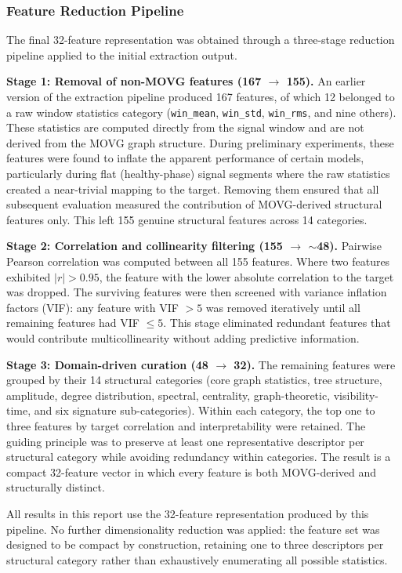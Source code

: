 \documentclass[a4paper,12pt]{article}
\begin{document}
\subsubsection{Feature Reduction Pipeline}

The final 32-feature representation was obtained through a three-stage reduction pipeline applied to the initial extraction output.

\textbf{Stage 1: Removal of non-MOVG features (167 $\to$ 155).} An earlier version of the extraction pipeline produced 167 features, of which 12 belonged to a raw window statistics category (\texttt{win\_mean}, \texttt{win\_std}, \texttt{win\_rms}, and nine others). These statistics are computed directly from the signal window and are not derived from the MOVG graph structure. During preliminary experiments, these features were found to inflate the apparent performance of certain models, particularly during flat (healthy-phase) signal segments where the raw statistics created a near-trivial mapping to the target. Removing them ensured that all subsequent evaluation measured the contribution of MOVG-derived structural features only. This left 155 genuine structural features across 14 categories.

\textbf{Stage 2: Correlation and collinearity filtering (155 $\to$ $\sim$48).} Pairwise Pearson correlation was computed between all 155 features. Where two features exhibited $|r| > 0.95$, the feature with the lower absolute correlation to the target was dropped. The surviving features were then screened with variance inflation factors (VIF): any feature with VIF $> 5$ was removed iteratively until all remaining features had VIF $\leq 5$. This stage eliminated redundant features that would contribute multicollinearity without adding predictive information.

\textbf{Stage 3: Domain-driven curation (48 $\to$ 32).} The remaining features were grouped by their 14 structural categories (core graph statistics, tree structure, amplitude, degree distribution, spectral, centrality, graph-theoretic, visibility-time, and six signature sub-categories). Within each category, the top one to three features by target correlation and interpretability were retained. The guiding principle was to preserve at least one representative descriptor per structural category while avoiding redundancy within categories. The result is a compact 32-feature vector in which every feature is both MOVG-derived and structurally distinct.

All results in this report use the 32-feature representation produced by this pipeline. No further dimensionality reduction was applied: the feature set was designed to be compact by construction, retaining one to three descriptors per structural category rather than exhaustively enumerating all possible statistics.
\end{document}
